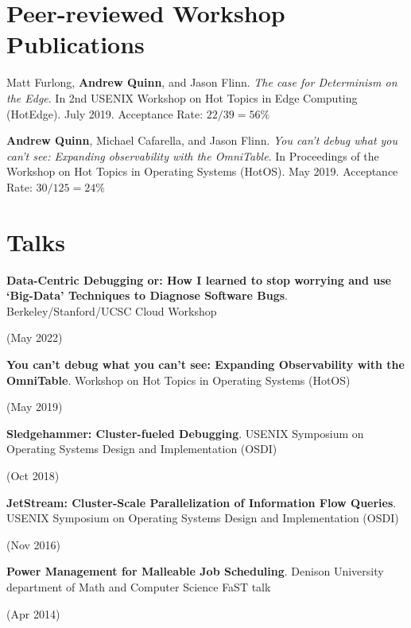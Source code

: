 \documentclass[letterpaper,10pt]{article}
\newcommand{\sidebyside}[2]{
  \begin{minipage}[t]{.75\textwidth}
    \raggedright{}
    #2
  \end{minipage}
  \hspace{.01\textwidth}
    \begin{minipage}[t]{.205\textwidth}
    \raggedleft
    #1
  \end{minipage}
}
\newcommand{\paper}[3]{#1. #2 #3}
\newcommand{\trio}[3]{\sidebyside{#3}{\textbf{#1}. #2}}
\begin{document}
\section{Peer-reviewed Workshop Publications}
\begin{smenumerate}
  \item \paper{Matt Furlong, \textbf{Andrew Quinn}, and Jason Flinn}
    {\emph{The case for Determinism on the Edge}.  In 2nd USENIX
      Workshop on Hot Topics in Edge Computing (HotEdge).  July
      2019.}{Acceptance Rate: $22/39=56\%$}

  \item \paper{\textbf{Andrew Quinn}, Michael Cafarella, and Jason
    Flinn}{\emph{You can't debug what you can't see: Expanding
    observability with the OmniTable}. In Proceedings of the Workshop
    on Hot Topics in Operating Systems (HotOS).  May 2019.}{Acceptance
    Rate: $30/125=24\%$}
\end{smenumerate}


\section{Talks}
\begin{smenumerate}
\item\trio{Data-Centric Debugging or: How I learned to stop worrying
  and use `Big-Data' Techniques to Diagnose Software
  Bugs}{Berkeley/Stanford/UCSC Cloud Workshop}{(May 2022)}
  
\item\trio{You can't debug what you can't see: Expanding Observability
  with the OmniTable}{Workshop on Hot Topics in Operating Systems
  (HotOS)}{(May 2019)}

\item\trio{Sledgehammer: Cluster-fueled Debugging}{USENIX Symposium on
  Operating Systems Design and Implementation (OSDI)}{(Oct 2018)}

\item\trio{JetStream: Cluster-Scale Parallelization of Information
  Flow Queries}{USENIX Symposium on Operating Systems Design and
  Implementation (OSDI)}{(Nov 2016)}

\item\trio{Power Management for Malleable Job Scheduling}{Denison
  University department of Math and Computer Science FaST talk}{(Apr
  2014)}
\end{smenumerate}
\end{document}
